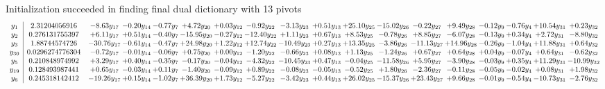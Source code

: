 \documentclass[9pt]{article}
\begin{document}
Initialization succeeded in finding final dual dictionary with 13 pivots
\[\begin{array}{c| c c@{\hskip 2pt} c@{\hskip 2pt} c@{\hskip 2pt} c@{\hskip 2pt} c@{\hskip 2pt} c@{\hskip 2pt} c@{\hskip 2pt} c@{\hskip 2pt} c@{\hskip 2pt} c@{\hskip 2pt} c@{\hskip 2pt} c@{\hskip 2pt} c@{\hskip 2pt} c@{\hskip 2pt} c@{\hskip 2pt} c@{\hskip 2pt} }
 y_{1}   &  2.31204056916 & -8.63 y_{17} & -0.20 y_{14} & -0.77 y_{7} & +  4.72 y_{20} & +  0.03 y_{12} & -0.92 y_{22} & -3.13 y_{23} & +  0.51 y_{13} & + 25.10 y_{25} & -15.02 y_{26} & -0.22 y_{27} & +  9.49 y_{28} & -0.12 y_{9} & -0.76 y_{4} & + 10.54 y_{31} & +  0.23 y_{32}\\
 y_{2}   &  0.276131755397 & +  6.11 y_{17} & +  0.51 y_{14} & -0.40 y_{7} & -15.95 y_{20} & -0.27 y_{12} & -12.40 y_{22} & +  1.11 y_{23} & +  0.67 y_{13} & +  8.53 y_{25} & -0.78 y_{26} & +  8.85 y_{27} & -6.07 y_{28} & -0.13 y_{9} & +  0.34 y_{4} & +  2.72 y_{31} & -8.80 y_{32}\\
 y_{3}   &  1.88744574726 & -30.76 y_{17} & -0.61 y_{14} & -0.47 y_{7} & + 24.98 y_{20} & +  1.22 y_{12} & + 12.74 y_{22} & -10.49 y_{23} & +  0.27 y_{13} & + 13.35 y_{25} & -3.86 y_{26} & -11.13 y_{27} & + 14.96 y_{28} & -0.26 y_{9} & -1.04 y_{4} & + 11.88 y_{31} & +  0.64 y_{32}\\
 y_{30}   &  0.0296274776304 & -0.72 y_{17} & -0.01 y_{14} & -0.06 y_{7} & +  0.75 y_{20} & +  0.00 y_{12} & -1.20 y_{22} & -0.66 y_{23} & +  0.08 y_{13} & +  1.13 y_{25} & -1.24 y_{26} & +  0.67 y_{27} & +  0.64 y_{28} & +  0.04 y_{9} & -0.07 y_{4} & +  0.64 y_{31} & -0.62 y_{32}\\
 y_{5}   &  0.210848974992 & +  3.29 y_{17} & +  0.40 y_{14} & -0.35 y_{7} & -0.17 y_{20} & -0.04 y_{12} & -4.32 y_{22} & -10.45 y_{23} & +  0.47 y_{13} & -0.04 y_{25} & -11.58 y_{26} & +  5.95 y_{27} & -3.90 y_{28} & -0.03 y_{9} & +  0.35 y_{4} & + 11.29 y_{31} & -10.99 y_{32}\\
 y_{19}   &  0.128493987441 & +  0.65 y_{17} & -0.03 y_{14} & +  0.11 y_{7} & -1.40 y_{20} & -0.09 y_{12} & +  0.89 y_{22} & -0.08 y_{23} & -0.05 y_{13} & -0.52 y_{25} & +  1.80 y_{26} & -2.36 y_{27} & -0.11 y_{28} & -0.05 y_{9} & -0.02 y_{4} & +  0.08 y_{31} & +  1.98 y_{32}\\
 y_{6}   &  0.245318142412 & -19.26 y_{17} & +  0.15 y_{14} & -1.02 y_{7} & + 36.39 y_{20} & +  1.73 y_{12} & -5.27 y_{22} & -3.42 y_{23} & +  0.44 y_{13} & + 26.02 y_{25} & -15.37 y_{26} & + 23.43 y_{27} & +  9.66 y_{28} & -0.01 y_{9} & -0.54 y_{4} & -10.73 y_{31} & -2.76 y_{32}\\

\end{array}\]
\end{document}
